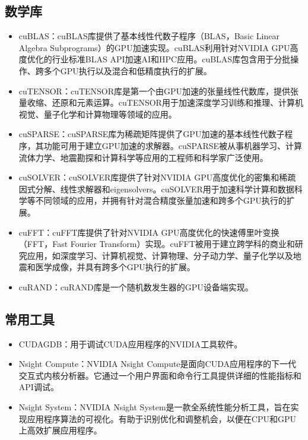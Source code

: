\documentclass[a4paper,12pt,english]{sphinxmanual}
\begin{document}
\subsection{数学库}
\label{\detokenize{gpu-computing/gpu-computing:id16}}\begin{itemize}
\item {} 
\sphinxAtStartPar
cuBLAS：cuBLAS库提供了基本线性代数子程序（BLAS，Basic Linear Algebra Subprograms）的GPU加速实现。cuBLAS利用针对NVIDIA GPU高度优化的行业标准BLAS API加速AI和HPC应用。cuBLAS库包含用于分批操作、跨多个GPU执行以及混合和低精度执行的扩展。

\item {} 
\sphinxAtStartPar
cuTENSOR：cuTENSOR库是第一个由GPU加速的张量线性代数库，提供张量收缩、还原和元素运算。cuTENSOR用于加速深度学习训练和推理、计算机视觉、量子化学和计算物理等领域的应用。

\item {} 
\sphinxAtStartPar
cuSPARSE：cuSPARSE库为稀疏矩阵提供了GPU加速的基本线性代数子程序，其功能可用于建立GPU加速的求解器。cuSPARSE被从事机器学习、计算流体力学、地震勘探和计算科学等应用的工程师和科学家广泛使用。

\item {} 
\sphinxAtStartPar
cuSOLVER：cuSOLVER库提供了针对NVIDIA GPU高度优化的密集和稀疏因式分解、线性求解器和eigensolvers。cuSOLVER用于加速科学计算和数据科学等不同领域的应用，并拥有针对混合精度张量加速和跨多个GPU执行的扩展。

\item {} 
\sphinxAtStartPar
cuFFT：cuFFT库提供了针对NVIDIA GPU高度优化的快速傅里叶变换（FFT，Fast Fourier Transform）实现。cuFFT被用于建立跨学科的商业和研究应用，如深度学习、计算机视觉、计算物理、分子动力学、量子化学以及地震和医学成像，并具有跨多个GPU执行的扩展。

\item {} 
\sphinxAtStartPar
cuRAND：cuRAND库是一个随机数发生器的GPU设备端实现。

\end{itemize}


\subsection{常用工具}
\label{\detokenize{gpu-computing/gpu-computing:id17}}\begin{itemize}
\item {} 
\sphinxAtStartPar
CUDA\sphinxhyphen{}GDB：用于调试CUDA应用程序的NVIDIA工具软件。

\item {} 
\sphinxAtStartPar
Nsight Compute：NVIDIA Nsight Compute是面向CUDA应用程序的下一代交互式内核分析器。它通过一个用户界面和命令行工具提供详细的性能指标和API调试。

\item {} 
\sphinxAtStartPar
Nsight System：NVIDIA Nsight System是一款全系统性能分析工具，旨在实现应用程序算法的可视化。有助于识别优化和调整机会，以便在CPU和GPU上高效扩展应用程序。

\end{itemize}
\end{document}
